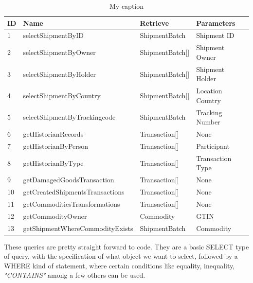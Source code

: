 \begin{table}[]
    \centering
    \begin{tabular}{|l|l|l|l|}
    \hline
    \textbf{ID} & \textbf{Name}                   & \textbf{Retrieve}   & \textbf{Parameters} \\ \hline
    1           & selectShipmentByID              & ShipmentBatch       & Shipment ID         \\ \hline
    2           & selectShipmentByOwner           & ShipmentBatch{[}{]} & Shipment Owner      \\ \hline
    3           & selectShipmentByHolder          & ShipmentBatch{[}{]} & Shipment Holder     \\ \hline
    4           & selectShipmentByCountry         & ShipmentBatch{[}{]} & Location Country    \\ \hline
    5           & selectShipmentByTrackingcode    & ShipmentBatch       & Tracking Number     \\ \hline
    6           & getHistorianRecords             & Transaction{[}{]}   & None                \\ \hline
    7           & getHistorianByPerson            & Transaction{[}{]}   & Participant         \\ \hline
    8           & getHistorianByType              & Transaction{[}{]}   & Transaction Type    \\ \hline
    9           & getDamagedGoodsTransaction      & Transaction{[}{]}   & None                \\ \hline
    10          & getCreatedShipmentsTransactions & Transaction{[}{]}   & None                \\ \hline
    11          & getCommoditiesTransformations   & Transaction{[}{]}   & None                \\ \hline
    12          & getCommodityOwner               & Commodity           & GTIN                \\ \hline
    13          & getShipmentWhereCommodityExists & ShipmentBatch       & Commodity           \\ \hline
    \end{tabular}
    \caption{My caption}
    \label{my-label}
    \end{table}


These queries are pretty straight forward to code. They are a basic SELECT type of query, with the specification of what object we want to select, followed by a WHERE kind of statement, where certain conditions like equality, inequality, \textit{"CONTAINS"} among a few others can be used. 

